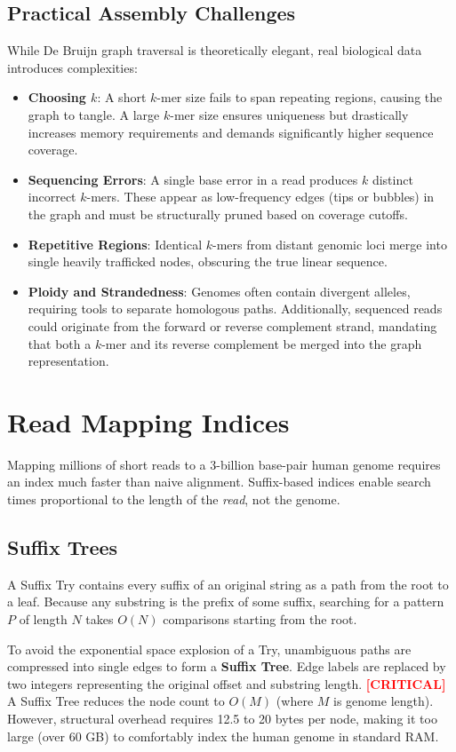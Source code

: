 \documentclass[11pt,a4paper]{article}
\newcommand{\sta}{\textbf{\textcolor{red}{[CRITICAL]}} }
\begin{document}
\subsection{Practical Assembly Challenges}
While De Bruijn graph traversal is theoretically elegant, real biological data introduces complexities:
\begin{itemize}
    \item \textbf{Choosing $k$}: A short $k$-mer size fails to span repeating regions, causing the graph to tangle. A large $k$-mer size ensures uniqueness but drastically increases memory requirements and demands significantly higher sequence coverage.
    \item \textbf{Sequencing Errors}: A single base error in a read produces $k$ distinct incorrect $k$-mers. These appear as low-frequency edges (tips or bubbles) in the graph and must be structurally pruned based on coverage cutoffs.
    \item \textbf{Repetitive Regions}: Identical $k$-mers from distant genomic loci merge into single heavily trafficked nodes, obscuring the true linear sequence.
    \item \textbf{Ploidy and Strandedness}: Genomes often contain divergent alleles, requiring tools to separate homologous paths. Additionally, sequenced reads could originate from the forward or reverse complement strand, mandating that both a $k$-mer and its reverse complement be merged into the graph representation.
\end{itemize}


\section{Read Mapping Indices}

Mapping millions of short reads to a 3-billion base-pair human genome requires an index much faster than naive alignment. Suffix-based indices enable search times proportional to the length of the \textit{read}, not the genome.

\subsection{Suffix Trees}
A Suffix Try contains every suffix of an original string as a path from the root to a leaf. Because any substring is the prefix of some suffix, searching for a pattern $P$ of length $N$ takes $O(N)$ comparisons starting from the root.

To avoid the exponential space explosion of a Try, unambiguous paths are compressed into single edges to form a \textbf{Suffix Tree}. Edge labels are replaced by two integers representing the original offset and substring length.
\sta A Suffix Tree reduces the node count to $O(M)$ (where $M$ is genome length). However, structural overhead requires 12.5 to 20 bytes per node, making it too large (over 60 GB) to comfortably index the human genome in standard RAM.
\end{document}
